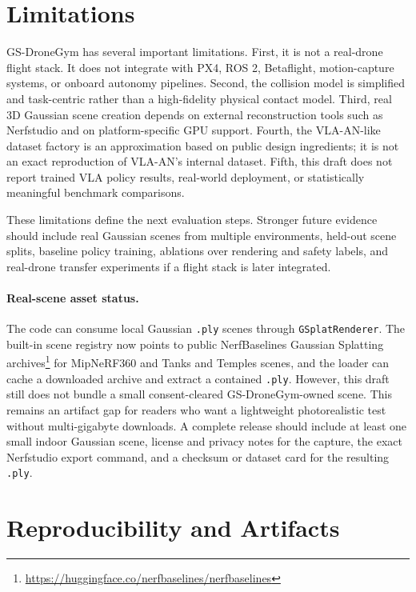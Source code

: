 \documentclass[11pt]{article}
\begin{document}
\section{Limitations}

GS-DroneGym has several important limitations. First, it is not a real-drone flight stack. It does not integrate with PX4, ROS 2, Betaflight, motion-capture systems, or onboard autonomy pipelines. Second, the collision model is simplified and task-centric rather than a high-fidelity physical contact model. Third, real 3D Gaussian scene creation depends on external reconstruction tools such as Nerfstudio and on platform-specific GPU support. Fourth, the VLA-AN-like dataset factory is an approximation based on public design ingredients; it is not an exact reproduction of VLA-AN's internal dataset. Fifth, this draft does not report trained VLA policy results, real-world deployment, or statistically meaningful benchmark comparisons.

These limitations define the next evaluation steps. Stronger future evidence should include real Gaussian scenes from multiple environments, held-out scene splits, baseline policy training, ablations over rendering and safety labels, and real-drone transfer experiments if a flight stack is later integrated.

\paragraph{Real-scene asset status.}
The code can consume local Gaussian \texttt{.ply} scenes through \texttt{GSplatRenderer}. The built-in scene registry now points to public NerfBaselines Gaussian Splatting archives\footnote{\url{https://huggingface.co/nerfbaselines/nerfbaselines}} for MipNeRF360 and Tanks and Temples scenes, and the loader can cache a downloaded archive and extract a contained \texttt{.ply}. However, this draft still does not bundle a small consent-cleared GS-DroneGym-owned scene. This remains an artifact gap for readers who want a lightweight photorealistic test without multi-gigabyte downloads. A complete release should include at least one small indoor Gaussian scene, license and privacy notes for the capture, the exact Nerfstudio export command, and a checksum or dataset card for the resulting \texttt{.ply}.

\section{Reproducibility and Artifacts}
\end{document}
